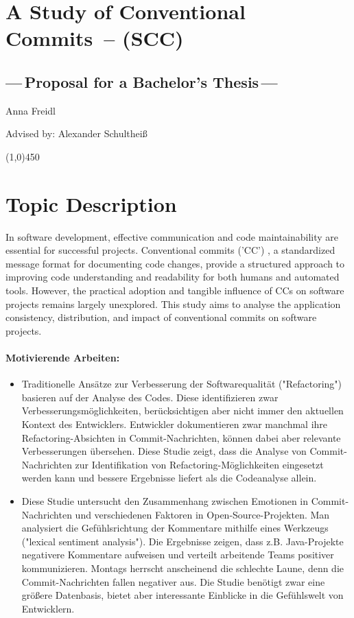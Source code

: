 \documentclass[11pt]{article}
\newcommand{\ThesisTitle}{A Study of Conventional Commits\xspace}
\newcommand{\ProjectAcronym}{\textsc{SCC}\xspace}
\begin{document}
\section*{\ThesisTitle\ -- (\ProjectAcronym)}
\subsection*{---\,Proposal for a Bachelor's Thesis\,---}

\sloppy

\noindent Anna Freidl

\noindent Advised by: Alexander Schultheiß

\begin{center}
\line(1,0){450}
\end{center}

\section*{Topic Description}

In software development, effective communication and code maintainability are essential for successful projects. Conventional commits ('CC') \cite{conventionalcommits}, a standardized message format for documenting code changes, provide a structured approach to improving code understanding and readability for both humans and automated tools. However, the  practical adoption and tangible influence of CCs on software projects remains largely unexplored. This study aims to analyse the application consistency, distribution, and impact of conventional commits on software projects.

\paragraph{Motivierende Arbeiten:} 
\begin{itemize}
\item \cite{refrecommendation} Traditionelle Ansätze zur Verbesserung der Softwarequalität ("Refactoring") basieren auf der Analyse des Codes. Diese identifizieren zwar Verbesserungsmöglichkeiten, berücksichtigen aber nicht immer den aktuellen Kontext des Entwicklers. Entwickler dokumentieren zwar manchmal ihre Refactoring-Absichten in Commit-Nachrichten, können dabei aber relevante Verbesserungen übersehen. Diese Studie zeigt, dass die Analyse von Commit-Nachrichten zur Identifikation von Refactoring-Möglichkeiten eingesetzt werden kann und bessere Ergebnisse liefert als die Codeanalyse allein.

\item \cite{commitanalysis} Diese Studie untersucht den Zusammenhang zwischen Emotionen in Commit-Nachrichten und verschiedenen Faktoren in Open-Source-Projekten. Man analysiert die Gefühlsrichtung der Kommentare mithilfe eines Werkzeugs ("lexical sentiment analysis"). Die Ergebnisse zeigen, dass z.B. Java-Projekte negativere Kommentare aufweisen und verteilt arbeitende Teams positiver kommunizieren. Montags herrscht anscheinend die schlechte Laune, denn die Commit-Nachrichten fallen negativer aus. Die Studie benötigt zwar eine größere Datenbasis, bietet aber interessante Einblicke in die Gefühlswelt von Entwicklern.
\end{itemize}
\end{document}

